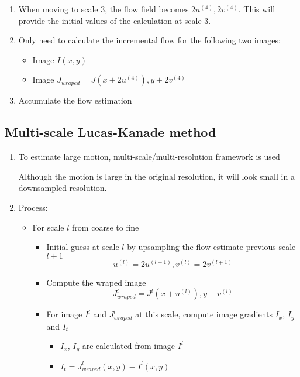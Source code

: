 \documentclass[9pt]{article}
\begin{document}
\begin{multicols*}{2}
\begin{enumerate}
        \item When moving to scale 3, the flow field becomes $2u^{(4)},
        2v^{(4)}$. This will provide the initial values of the calculation at
        scale 3.
        
        \item Only need to calculate the incremental flow for the following two images:
        \begin{itemize}
            \item Image $I(x,y)$
            \item Image $J_{wraped} = J(x + 2u^{(4)}), y + 2v^{(4)}$
        \end{itemize}

        \item Accumulate the flow estimation 
    \end{enumerate}

    \subsection{Multi-scale Lucas-Kanade method}
    \begin{enumerate}
        \item To estimate large motion, multi-scale/multi-resolution framework is used 
        
        Although the motion is large in the original resolution, it will look small in a 
        downsampled resolution.

        \item Process:
        \begin{itemize}
            \item For scale $l$ from coarse to fine 
            \begin{itemize}
                \item Initial guess at scale $l$ by upsampling the flow estimate
                previous scale $l+1$ 
                $$
                    u^{(l)} = 2u^{(l+1)}, v^{(l)} = 2v^{(l+1)}
                $$
                \item Compute the wraped image 
                $$
                    J_{wraped}^l = J^l (x + u^{(l)}), y + v^{(l)}
                $$

                \item For image $I^l$ and $J_{wraped}^l$ at this scale, compute
                image gradients $I_x$, $I_y$ and $I_t$
                \begin{itemize}
                    \item $I_x$, $I_y$ are calculated from image $I^l$
                    \item $I_t = J_{wraped}^l (x,y) - I^l(x,y)$
                \end{itemize}


\end{itemize}
\end{itemize}
\end{enumerate}
\end{multicols*}
\end{document}
